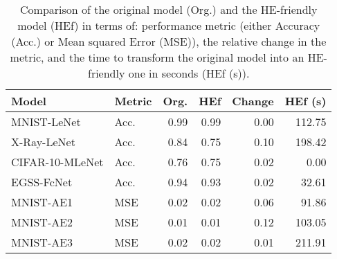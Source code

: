 \begin{table}
\centering
\caption{
      Comparison of the original model (Org.) and the HE-friendly model (HEf) in
      terms of: performance metric (either Accuracy (Acc.) or Mean squared Error
      (MSE)), the relative change in the metric, and the time to transform the 
      original model into an HE-friendly one in seconds (HEf (s)). 
      }
\label{tab:org_vs_hef}
\begin{tabular}{llrrrr}
\toprule
          Model & Metric &  Org. &  HEf &  Change &  HEf (s) \\
\midrule
    MNIST-LeNet &   Acc. &  0.99 & 0.99 &    0.00 &   112.75 \\
    X-Ray-LeNet &   Acc. &  0.84 & 0.75 &    0.10 &   198.42 \\
CIFAR-10-MLeNet &   Acc. &  0.76 & 0.75 &    0.02 &     0.00 \\
     EGSS-FcNet &   Acc. &  0.94 & 0.93 &    0.02 &    32.61 \\
      MNIST-AE1 &    MSE &  0.02 & 0.02 &    0.06 &    91.86 \\
      MNIST-AE2 &    MSE &  0.01 & 0.01 &    0.12 &   103.05 \\
      MNIST-AE3 &    MSE &  0.02 & 0.02 &    0.01 &   211.91 \\
\bottomrule
\end{tabular}
\end{table}
